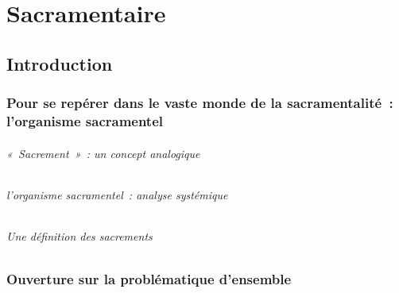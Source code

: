 \part{Sacramentaire}



\chapter{Introduction}


\hypertarget{pour-se-repuxe9rer-dans-le-vaste-monde-de-la-sacramentalituxe9-lorganisme-sacramentel}{%
\section{Pour se repérer dans le vaste monde de la sacramentalité~:
l'organisme
sacramentel}\label{pour-se-repuxe9rer-dans-le-vaste-monde-de-la-sacramentalituxe9-lorganisme-sacramentel}}

\hypertarget{sacrement-un-concept-analogique}{%
\paragraph{«~Sacrement~»~: un concept
analogique}\label{sacrement-un-concept-analogique}}

\hypertarget{lorganisme-sacramentel-analyse-systuxe9mique}{%
\paragraph{l'organisme sacramentel~: analyse
systémique}\label{lorganisme-sacramentel-analyse-systuxe9mique}}

\hypertarget{une-duxe9finition-des-sacrements}{%
\paragraph{\texorpdfstring{Une définition des
sacrements}{ Une définition des sacrements}}\label{une-duxe9finition-des-sacrements}}
 

\section{Ouverture sur la problématique
d'ensemble} 

